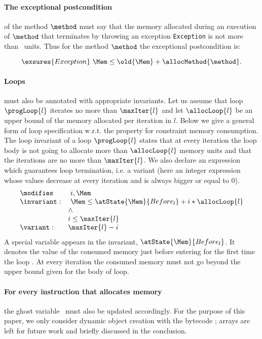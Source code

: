 \paragraph{The exceptional postcondition} of the method $\method$ must
say that the memory allocated during an execution of $\method$ that
terminates by throwing an exception \texttt{Exception} is not more
than \allocMethod{\method}\ units. Thus for the method $\method$ the
exceptional postcondition is:

$$
\exsures{Exception} \  \Mem \leq \old{\Mem} + \allocMethod{\method}.
$$


\paragraph{Loops} must also be annotated with appropriate invariants. 
Let us assume that loop $\progLoop{l}$ iterates no more than $\maxIter{l}$ and let $\allocLoop{l}$ be an upper bound of the memory allocated per iteration in $l$.
Below we give a general form of loop specification w.r.t. the property for constraint memory consumption. The loop invariant of a loop $\progLoop{l}$ states that at every iteration the loop body is not going to allocate more than $\allocLoop{l}$ memory units and that the iterations are no more than $\maxIter{l}$. We also declare an expression which guarantees loop termination, i.e. a variant (here an integer expression whose values decrease at every iteration  and is always bigger or equal to 0).
$$\begin{array}{ll}
\modifies &  \ i, \Mem \\
\invariant: & \ \Mem \le \atState{\Mem}{Before_{l}} + i * \allocLoop{l} \\
                & \wedge \\
                & i \le \maxIter{l}\\
\variant: & \maxIter{l} - i \\
\end{array}$$
 A special variable appears in the invariant, $\atState{\Mem}{Before_{l}}$. It denotes the value of the consumed memory just before entering for the first time the loop . At every iteration the consumed memory must not go beyond the upper bound given for the body of loop.

\paragraph{For every instruction that allocates memory} the ghost
variable \Mem\ must also be updated accordingly. For the purpose of
this paper, we only consider dynamic object creation with the bytecode
\new; arrays are left for future work and briefly discussed in the
conclusion. 


